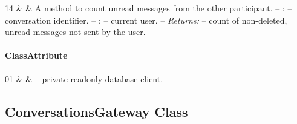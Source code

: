 \begin{ClassMethodTable}
14 & \newline{} &
A method to count unread messages from the other participant.
\newline -- :  -- conversation identifier.
\newline -- :  -- current user.
\newline -- \textit{Returns:}  -- count of non-deleted, unread messages not sent by the user. \\ \hline
\end{ClassMethodTable}

\paragraph{ClassAttribute}
\begin{ClassAttributeTable}
01 &  &  -- private readonly database client. \\ \hline
\end{ClassAttributeTable}

\subsection{ConversationsGateway Class}

